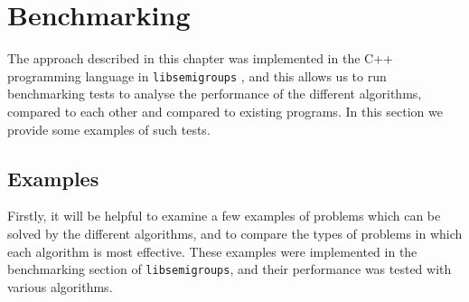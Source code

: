 


\section{Benchmarking}
\label{sec:benchmarking}

The approach described in this chapter was implemented in the C++ programming
language in \texttt{libsemigroups} \cite{libsemigroups}, and this allows us to
run benchmarking tests to analyse the performance of the different algorithms,
compared to each other and compared to existing programs.  In this section we
provide some examples of such tests.

\subsection{Examples}
Firstly, it will be helpful to examine a few examples of problems which can be
solved by the different algorithms, and to compare the types of problems in
which each algorithm is most effective.  These examples were implemented in the
benchmarking section of \texttt{libsemigroups}, and their performance was tested
with various algorithms.

